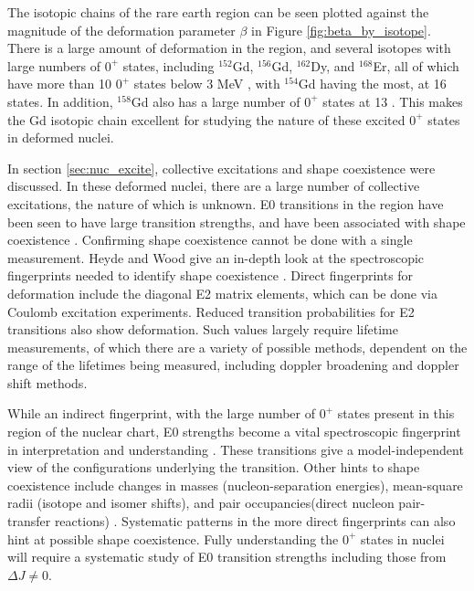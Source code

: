 The isotopic chains of the rare earth region can be seen plotted against the magnitude of the deformation parameter $\beta$ in Figure \ref{fig:beta_by_isotope}. There is a large amount of deformation in the region, and several isotopes with large numbers of $0^+$ states, including $^{152}$Gd, $^{156}$Gd, $^{162}$Dy, and $^{168}$Er, all of which have more than 10 $0^+$ states below 3 MeV \citep{meyer06:_zeroplus}, with $^{154}$Gd having the most, at 16 states. In addition, $^{158}$Gd also has a large number of $0^+$ states at 13 \citep{lesher02:_158gd}. This makes the Gd isotopic chain excellent for studying the nature of these excited $0^+$ states in deformed nuclei.

In section \ref{sec:nuc_excite}, collective excitations and shape coexistence were discussed. In these deformed nuclei, there are a large number of collective excitations, the nature of which is unknown. E0 transitions in the region have been seen to have large transition strengths, and have been associated with shape coexistence \citep{wood99:_e0}. Confirming shape coexistence cannot be done with a single measurement. Heyde and Wood give an in-depth look at the spectroscopic fingerprints needed to identify shape coexistence \citep{heyde11:_shape_coexist}. Direct fingerprints for deformation include the diagonal E2 matrix elements, which can be done via Coulomb excitation experiments. Reduced transition probabilities for E2 transitions also show deformation. Such values largely require lifetime measurements, of which there are a variety of possible methods, dependent on the range of the lifetimes being measured, including doppler broadening and doppler shift methods. 

While an indirect fingerprint, with the large number of $0^+$ states present in this region of the nuclear chart, E0 strengths become a vital spectroscopic fingerprint in interpretation and understanding \citep{heyde11:_shape_coexist}. These transitions give a model-independent view of the configurations underlying the transition. Other hints to shape coexistence include changes in masses (nucleon-separation energies), mean-square radii (isotope and isomer shifts), and pair occupancies(direct nucleon pair-transfer reactions) \citep{heyde11:_shape_coexist}. Systematic patterns in the more direct fingerprints can also hint at possible shape coexistence. Fully understanding the $0^+$ states in nuclei will require a systematic study of E0 transition strengths including those from $\Delta J\neq0$.